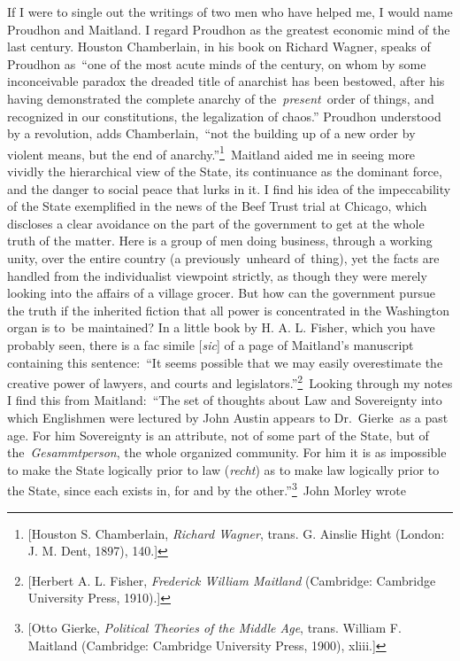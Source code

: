 \documentclass[openany,nobib]{tufte-book}
\begin{document}
If I were to single out the writings of two men who have helped me, I
would name Proudhon and Maitland. I regard Proudhon as the greatest
economic mind of the last century. Houston Chamberlain, in his book on
Richard Wagner, speaks of Proudhon as~``one of the most acute minds of
the century, on whom by some inconceivable paradox the dreaded title of
anarchist has been bestowed, after his having demonstrated the complete
anarchy of the~\emph{present}~order of things, and recognized in our
constitutions, the legalization of chaos.'' Proudhon understood by a
revolution, adds Chamberlain,~``not the building up of a new order by
violent means, but the end of anarchy.''\footnote{{[}Houston S.
  Chamberlain, \emph{Richard Wagner}, trans. G. Ainslie Hight \emph{}
  (London: J. M. Dent, 1897), 140.{]}}~Maitland aided me in seeing more
vividly the hierarchical view of the State, its continuance as the
dominant force, and the danger to social peace that lurks in it. I find
his idea of the impeccability of the State exemplified in the news of
the Beef Trust trial at Chicago, which discloses a clear avoidance on
the part of the government to get at the whole truth of the matter. Here
is a group of men doing business, through a working unity, over the
entire country (a previously~unheard of~thing), yet the facts are
handled from the individualist viewpoint strictly, as though they were
merely looking into the affairs of a village grocer. But how can the
government pursue the truth if the inherited fiction that all power is
concentrated in the Washington organ is to~be maintained? In a little
book by H. A. L. Fisher, which you have probably seen, there is a fac
simile {[}\emph{sic}{]} of a page of Maitland's manuscript containing
this sentence:~``It seems possible that we may easily overestimate the
creative power of lawyers, and courts and
legislators.''\footnote{{[}Herbert A. L. Fisher, \emph{Frederick William
  Maitland} (Cambridge: Cambridge University Press, 1910).{]}}~Looking
through my notes I find this from Maitland:~``The set of thoughts about
Law and Sovereignty into which Englishmen were lectured by John Austin
appears to Dr.~Gierke~as a past age. For him Sovereignty is an
attribute, not of some part of the State, but of
the~\emph{Gesammtperson}, the whole organized community. For him it is
as impossible to make the State logically prior to law (\emph{recht}) as
to make law logically prior to the State, since each exists in, for and
by the other.''\footnote{{[}Otto Gierke, \emph{Political Theories of the
  Middle Age}, trans. William F. Maitland \emph{} (Cambridge: Cambridge
  University Press, 1900), \emph{} xliii.{]}}~John Morley wrote
\end{document}
